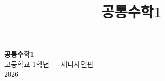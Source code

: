 \documentclass[10pt,oneside]{book}
\title{공통수학1}
\author{}
\date{}
\begin{document}
\frontmatter
\begin{titlepage}
  \vspace*{5cm}
  \begin{center}
    {\Huge\sffamily\bfseries\color{tbk-accent}공통수학1}\\[6mm]
    {\Large\sffamily 고등학교 1학년 — 재디자인판}\\[2cm]
    {\large 2026}
  \end{center}
\end{titlepage}

\tableofcontents

\mainmatter

% 
% 
% 
% 
% 
% 
% 
% 
% 
% 
\end{document}
